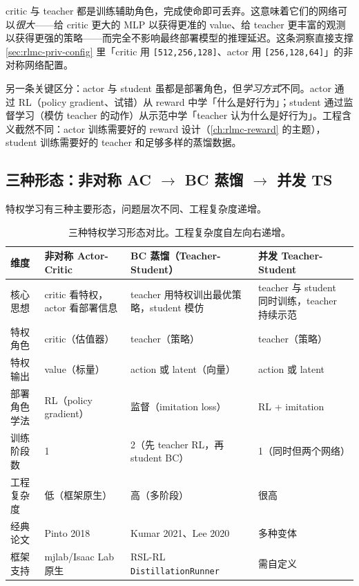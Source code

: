 \begin{insight}\label{ins:rlmc-priv-free}
critic 与 teacher 都是训练辅助角色，完成使命即可丢弃。这意味着它们的网络可以\emph{很大}——给 critic 更大的 MLP 以获得更准的 value、给 teacher 更丰富的观测以获得更强的策略——而完全不影响最终部署模型的推理延迟。这条洞察直接支撑 \cref{sec:rlmc-priv-config} 里「critic 用 \texttt{[512,256,128]}、actor 用 \texttt{[256,128,64]}」的非对称网络配置。
\end{insight}

另一条关键区分：actor 与 student 虽都是部署角色，但\emph{学习方式}不同。actor 通过 RL（policy gradient、试错）从 reward 中学「什么是好行为」；student 通过监督学习（模仿 teacher 的动作）从示范中学「teacher 认为什么是好行为」。工程含义截然不同：actor 训练需要好的 reward 设计（\cref{ch:rlmc-reward} 的主题），student 训练需要好的 teacher 和足够多样的蒸馏数据。

\subsection{三种形态：非对称 AC \texorpdfstring{$\to$}{->} BC 蒸馏 \texorpdfstring{$\to$}{->} 并发 TS}
\label{sec:rlmc-priv-three}

特权学习有三种主要形态，问题层次不同、工程复杂度递增。

\begin{table}[H]
\centering
\small
\caption{三种特权学习形态对比。工程复杂度自左向右递增。}
\label{tab:rlmc-priv-forms}
\begin{tabular}{@{}p{2.2cm}p{3.2cm}p{3.2cm}p{3.2cm}@{}}
\toprule
维度 & 非对称 Actor-Critic & BC 蒸馏（Teacher-Student） & 并发 Teacher-Student \\
\midrule
核心思想 & critic 看特权，actor 看部署信息 & teacher 用特权训出最优策略，student 模仿 & teacher 与 student 同时训练，teacher 持续示范 \\
特权角色 & critic（估值器） & teacher（策略） & teacher（策略） \\
特权输出 & value（标量） & action 或 latent（向量） & action 或 latent \\
部署角色学法 & RL（policy gradient） & 监督（imitation loss） & RL + imitation \\
训练阶段数 & 1 & 2（先 teacher RL，再 student BC） & 1（同时但两个网络） \\
工程复杂度 & 低（框架原生） & 高（多阶段） & 很高 \\
经典论文 & Pinto 2018 & Kumar 2021、Lee 2020 & 多种变体 \\
框架支持 & mjlab/Isaac Lab 原生 & RSL-RL \texttt{DistillationRunner} & 需自定义 \\
\bottomrule
\end{tabular}
\end{table}

